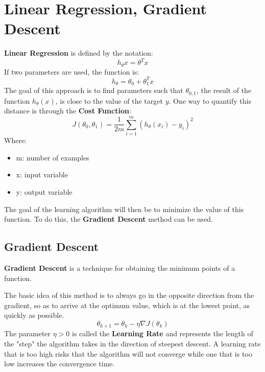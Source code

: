 \section{Linear Regression, Gradient Descent}

\textbf{Linear Regression} is defined by the notation:
\begin{equation} \tag{Linear Regression}
    h_\theta x = \theta^T x
\end{equation}
If two parameters are used, the function is:
\begin{equation} \tag{Linear Regression}
    h_\theta = \theta_0 + \theta_1^T x
\end{equation}
The goal of this approach is to find parameters such that $\theta_{0,1}$, the result of the function $h_\theta(x)$, is close to the value of the target $y$.  One way to quantify this distance is through the \textbf{Cost Function}:
\begin{equation} \tag{Cost Function}
    J(\theta_0,\theta_1) = \frac{1}{2m} \sum_{i=1}^m (h_{\theta}(x_i)-y_i)^2
\end{equation}
Where:
\begin{itemize}
    \item m: number of examples
    \item x: input variable
    \item y: output variable
\end{itemize}
The goal of the learning algorithm will then be to minimize the value of this function. To do this, the \textbf{Gradient Descent} method can be used.

\subsection{Gradient Descent}
\begin{mdframed}
    \textbf{Gradient Descent} is a technique for obtaining the minimum points of a function.
\end{mdframed}
 The basic idea of this method is to always go in the opposite direction from the gradient, so as to arrive at the optimum value, which is at the lowest point, as quickly as possible.
\begin{equation} \tag{Gradient Descent}
    \theta_{k+1} = \theta_k - \eta \nabla J(\theta_k)
\end{equation}
The parameter $\eta>0$ is called the \textbf{Learning Rate} and represents the length of the "step" the algorithm takes in the direction of steepest descent.
A learning rate that is too high risks that the algorithm will not converge while one that is too low increases the convergence time.
